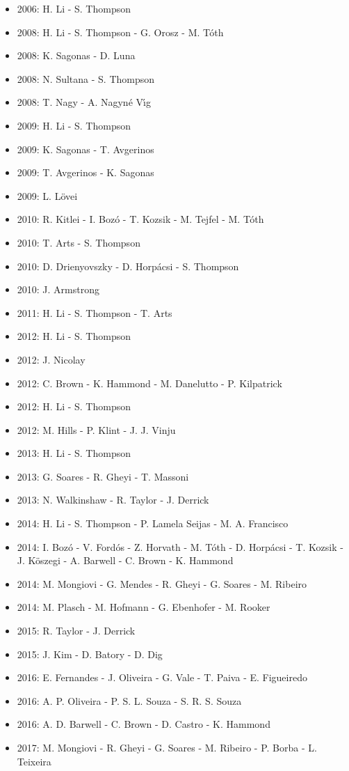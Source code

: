 \begin{itemize}
\item 2006: H. Li - S. Thompson
\item 2008: H. Li - S. Thompson - G. Orosz - M. T\'{o}th
\item 2008: K. Sagonas - D. Luna
\item 2008: N. Sultana - S. Thompson
\item 2008: T. Nagy - A. Nagyn{\'e} V\'{\i}g
\item 2009: H. Li - S. Thompson
\item 2009: K. Sagonas - T. Avgerinos
\item 2009: T. Avgerinos - K. Sagonas
\item 2009: L. L\"{o}vei
\item 2010: R. Kitlei - I. Boz\'{o} - T. Kozsik - M. Tejfel - M. T\'{o}th
\item 2010: T. Arts - S. Thompson
\item 2010: D. Drienyovszky - D. Horp\'{a}csi - S. Thompson
\item 2010: J. Armstrong
\item 2011: H. Li - S. Thompson - T. Arts
\item 2012: H. Li - S. Thompson
\item 2012: J. Nicolay
\item 2012: C. Brown - K. Hammond - M. Danelutto - P. Kilpatrick
\item 2012: H. Li - S. Thompson
\item 2012: M. Hills - P. Klint - J. J. Vinju
\item 2013: H. Li - S. Thompson
\item 2013: G. Soares - R. Gheyi - T. Massoni
\item 2013: N. Walkinshaw - R. Taylor - J. Derrick
\item 2014: H. Li - S. Thompson - P. Lamela Seijas - M. A. Francisco
\item 2014: I. Boz\'{o} - V. Ford\'{o}s - Z. Horvath - M. T\'{o}th - D. Horp\'{a}csi - T. Kozsik - J. K\"{o}szegi - A. Barwell - C. Brown - K. Hammond
\item 2014: M. Mongiovi - G. Mendes - R. Gheyi - G. Soares - M. Ribeiro
\item 2014: M. Plasch - M. Hofmann - G. Ebenhofer - M. Rooker
\item 2015: R. Taylor - J. Derrick
\item 2015: J. Kim - D. Batory - D. Dig
\item 2016: E. Fernandes - J. Oliveira - G. Vale - T. Paiva - E. Figueiredo
\item 2016: A. P. Oliveira - P. S. L. Souza - S. R. S. Souza
\item 2016: A. D. Barwell - C. Brown - D. Castro - K. Hammond
\item 2017: M. Mongiovi - R. Gheyi - G. Soares - M. Ribeiro - P. Borba - L. Teixeira
\end{itemize}

